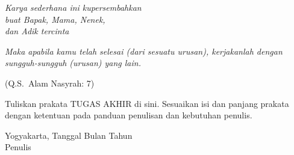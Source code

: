 \documentclass[skripsi]{ugmskripsi}
\begin{document}

\cover
\titlepageind

\approvalpage
\declarepage

\acknowledment{}
\begin{flushright}
\emph{Karya sederhana ini kupersembahkan \\
buat Bapak, Mama, Nenek, \\dan Adik tercinta}
\end{flushright}

\motto{}
\emph{Maka apabila kamu telah selesai (dari sesuatu urusan), kerjakanlah
dengan sungguh-sungguh (urusan) yang lain.}

\begin{flushright}
(Q.S.\ Alam Nasyrah: 7)
\end{flushright}

\preface

Tuliskan prakata TUGAS AKHIR di sini. Sesuaikan isi dan panjang prakata dengan
ketentuan pada panduan penulisan dan kebutuhan penulis.

\begin{flushright}
Yogyakarta, Tanggal Bulan Tahun\\
Penulis
\end{flushright}
\end{document}
